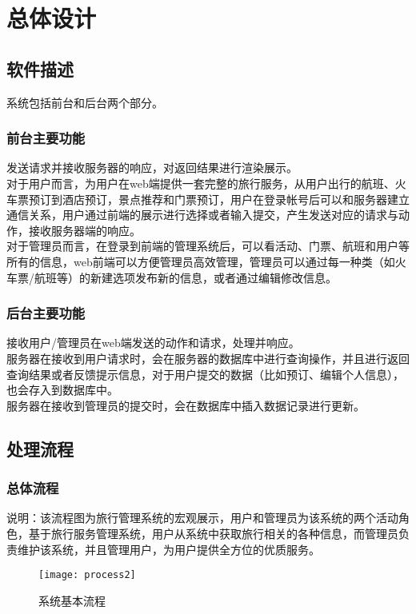 \chapter{总体设计}
\section{软件描述}
系统包括前台和后台两个部分。

\subsection{前台主要功能}
\indent    发送请求并接收服务器的响应，对返回结果进行渲染展示。\\
\indent    对于用户而言，为用户在web端提供一套完整的旅行服务，从用户出行的航班、火车票预订到酒店预订，景点推荐和门票预订，用户在登录帐号后可以和服务器建立通信关系，用户通过前端的展示进行选择或者输入提交，产生发送对应的请求与动作，接收服务器端的响应。\\
\indent    对于管理员而言，在登录到前端的管理系统后，可以看活动、门票、航班和用户等所有的信息，web前端可以方便管理员高效管理，管理员可以通过每一种类（如火车票/航班等）的新建选项发布新的信息，或者通过编辑修改信息。
\subsection{后台主要功能}
\indent    接收用户/管理员在web端发送的动作和请求，处理并响应。\\
\indent    服务器在接收到用户请求时，会在服务器的数据库中进行查询操作，并且进行返回查询结果或者反馈提示信息，对于用户提交的数据（比如预订、编辑个人信息），也会存入到数据库中。\\
\indent    服务器在接收到管理员的提交时，会在数据库中插入数据记录进行更新。

\newpage
\section{处理流程}
\subsection{总体流程}
说明：该流程图为旅行管理系统的宏观展示，用户和管理员为该系统的两个活动角色，基于旅行服务管理系统，用户从系统中获取旅行相关的各种信息，而管理员负责维护该系统，并且管理用户，为用户提供全方位的优质服务。
\begin{figure}[ht]
\texttt{[image: process2]}
\caption{系统基本流程} \label{fig:figure2}
\end{figure}

